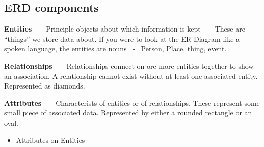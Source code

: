 \documentclass{report}
\begin{document}
    \subsection*{ERD components}
        \item \textbf{Entities} \ - \ Principle objects about which information is kept \ - \ These are ``things'' we store data about. If you were to look at the ER Diagram like a spoken language, the entities are nouns \ - \ Person, Place, thing, event.
        \item \textbf{Relationships} \ - \ Relationships connect on ore more entities together to show an association. A relationship cannot exist without at least one associated entity. Represented as diamonds.
        \item \textbf{Attributes} \ - \ Characterists of entities or of relationships. These represent some small piece of associated data. Represented by either a rounded rectangle or an oval.
            \begin{itemize}[label=$\circ$]
                \item Attributes on Entities
            \end{itemize}
\end{document}
